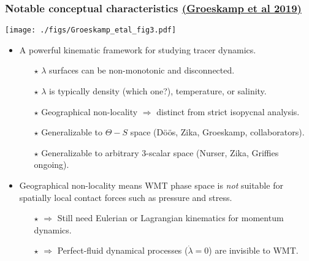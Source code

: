 \documentclass[10pt]{beamer}
\begin{document}
\begin{frame}
  \frametitle{Notable conceptual characteristics
\small \href{https://www.annualreviews.org/doi/abs/10.1146/annurev-marine-010318-095421}{(Groeskamp et al 2019)}
}

\begin{center}
\vspace{-.1cm}
{\texttt{[image: ./figs/Groeskamp\_etal\_fig3.pdf]}}
\end{center}
\vspace{-.3cm}

\begin{exampleblock}{}
\begin{itemize}

\item  A powerful kinematic framework for studying tracer dynamics. 
 \begin{itemize}
 \footnotesize 
   \item[$\star$] $\lambda$ surfaces can be non-monotonic and disconnected.
   \item[$\star$] $\lambda$ is typically density (which one?), temperature, or salinity. 
   \item[$\star$] Geographical non-locality $\Longrightarrow$ distinct from strict isopycnal analysis.
   \item[$\star$] Generalizable to $\Theta-S$ space ({D\"{o}\"{o}s},
     Zika, Groeskamp, collaborators).
   \item[$\star$] Generalizable to arbitrary 3-scalar space (Nurser,
     Zika, Griffies ongoing).
 \end{itemize}

\item Geographical non-locality means WMT phase space is {\it not}
  suitable for spatially local contact forces such as pressure and
  stress.
\begin{itemize}
 \footnotesize 
\item[$\star$] $\Longrightarrow$ Still need Eulerian or Lagrangian
  kinematics for momentum dynamics.
\item[$\star$] $\Longrightarrow$ Perfect-fluid dynamical processes
  ($\dot{\lambda} = 0$) are invisible to WMT.
\end{itemize}

\end{itemize}
\end{exampleblock}{}

\end{frame}
\end{document}
